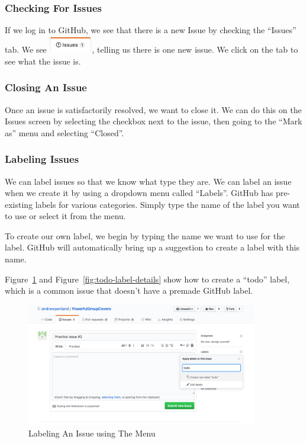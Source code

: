 \documentclass[11pt]{article}
\begin{document}
\subsubsection{Checking For Issues}

If we log in to GitHub, we see that there is a new Issue by checking the ``Issues'' tab. We see \includegraphics[width=0.75in]{IssuesLink}, telling us there is one new issue. We click on the tab to see what the issue is.

\subsubsection{Closing An Issue} 

Once an issue is satisfactorily resolved, we want to close it. We can do this on the Issues screen by selecting the checkbox next to the issue, then going to the ``Mark as'' menu and selecting ``Closed''.


\subsubsection{Labeling Issues}

We can label issues so that we know what type they are. We can label an issue when we create it by using a dropdown menu called ``Labels''. GitHub has pre-existing labels for various categories. Simply type the name of the label you want to use or select it from the menu. 

To create our own label, we begin by typing the name we want to use for the label. GitHub will automatically bring up a suggestion to create a label with this name.

Figure~\ref{fig:begin-typing-todo} and Figure~\ref{fig:todo-label-details} show how to create a ``todo'' label, which is a common issue that doesn't have a premade GitHub label. 


\begin{figure}\label{fig:begin-typing-todo}
\includegraphics[width=0.9\textwidth]{CreatingLabels}
\caption{Labeling An Issue using The Menu}
\end{figure}
\end{document}
